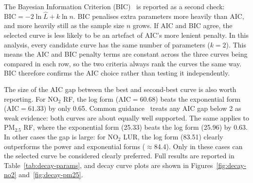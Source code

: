 \documentclass[11pt,a4paper]{article}
\begin{document}
The Bayesian Information Criterion (BIC)~\cite{schwarz_1978} is reported as a second check: $\mathrm{BIC} = -2 \ln \hat{L} + k \ln n$. BIC penalises extra parameters more heavily than AIC, and more heavily still as the sample size $n$ grows. If AIC and BIC agree, the selected curve is less likely to be an artefact of AIC's more lenient penalty. In this analysis, every candidate curve has the same number of parameters ($k=2$). This means the AIC and BIC penalty terms are constant across the three curves being compared in each row, so the two criteria always rank the curves the same way. BIC therefore confirms the AIC choice rather than testing it independently.

The size of the AIC gap between the best and second-best curve is also worth reporting. For NO$_2$ RF, the log form (AIC$=60.68$) beats the exponential form (AIC$=61.33$) by only 0.65. Common guidance~\cite{burnham_anderson_2002} treats any AIC gap below 2 as weak evidence: both curves are about equally well supported. The same applies to PM$_{2.5}$ RF, where the exponential form (25.33) beats the log form (25.96) by 0.63. In other cases the gap is large: for NO$_2$ LUR, the log form (83.51) clearly outperforms the power and exponential forms ($\approx$84.4). Only in these cases can the selected curve be considered clearly preferred. Full results are reported in Table~\ref{tab:decay-params}, and decay curve plots are shown in Figures~\ref{fig:decay-no2} and~\ref{fig:decay-pm25}.
\end{document}
